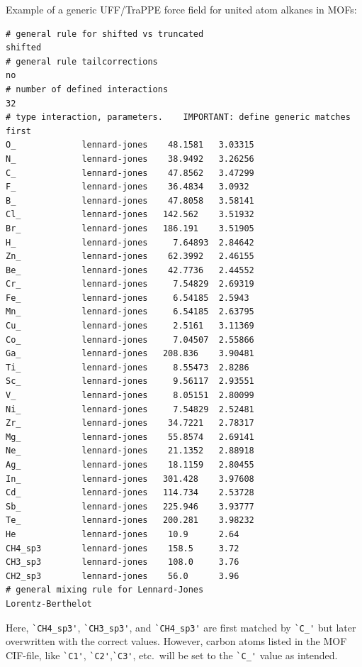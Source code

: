 Example of a generic UFF/TraPPE force field for united atom alkanes in MOFs:
\begin{verbatim}
# general rule for shifted vs truncated
shifted
# general rule tailcorrections
no
# number of defined interactions
32
# type interaction, parameters.    IMPORTANT: define generic matches first
O_             lennard-jones    48.1581   3.03315
N_             lennard-jones    38.9492   3.26256
C_             lennard-jones    47.8562   3.47299
F_             lennard-jones    36.4834   3.0932
B_             lennard-jones    47.8058   3.58141
Cl_            lennard-jones   142.562    3.51932
Br_            lennard-jones   186.191    3.51905
H_             lennard-jones     7.64893  2.84642
Zn_            lennard-jones    62.3992   2.46155
Be_            lennard-jones    42.7736   2.44552
Cr_            lennard-jones     7.54829  2.69319
Fe_            lennard-jones     6.54185  2.5943
Mn_            lennard-jones     6.54185  2.63795
Cu_            lennard-jones     2.5161   3.11369
Co_            lennard-jones     7.04507  2.55866
Ga_            lennard-jones   208.836    3.90481
Ti_            lennard-jones     8.55473  2.8286
Sc_            lennard-jones     9.56117  2.93551
V_             lennard-jones     8.05151  2.80099
Ni_            lennard-jones     7.54829  2.52481
Zr_            lennard-jones    34.7221   2.78317
Mg_            lennard-jones    55.8574   2.69141
Ne_            lennard-jones    21.1352   2.88918
Ag_            lennard-jones    18.1159   2.80455
In_            lennard-jones   301.428    3.97608
Cd_            lennard-jones   114.734    2.53728
Sb_            lennard-jones   225.946    3.93777
Te_            lennard-jones   200.281    3.98232
He             lennard-jones    10.9      2.64
CH4_sp3        lennard-jones    158.5     3.72
CH3_sp3        lennard-jones    108.0     3.76
CH2_sp3        lennard-jones    56.0      3.96
# general mixing rule for Lennard-Jones
Lorentz-Berthelot
\end{verbatim}

Here, \verb=`CH4_sp3'=, \verb=`CH3_sp3'=, and \verb=`CH4_sp3'= are first matched by \verb=`C_'= but later overwritten with the correct values.
However, carbon atoms listed in the MOF CIF-file, like \verb=`C1'=, \verb=`C2'=,\verb=`C3'=, etc.\ will be set to the \verb=`C_'= value as intended.

